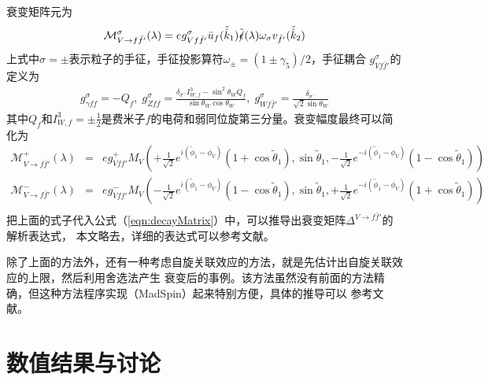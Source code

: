 衰变矩阵元为
\begin{eqnarray}
\mathcal{M}^{\sigma}_{V\to f\bar f'}(\lambda) = eg^{\sigma}_{Vf\bar f'} \bar{u}_f(\tilde{\hat k}_1)
\tilde{\slashed{\epsilon}}(\lambda) \omega_{\sigma}v_{\bar f'}(\tilde{\hat k}_2)
\label{eqn:decayMatrix}
\end{eqnarray}
上式中$\sigma = \pm$表示粒子的手征，手征投影算符$\omega_{\pm} = (1\pm\gamma_5)/2$，手征耦合
$g^{\sigma}_{Vf\bar f'}$的定义为
\begin{eqnarray}
g^{\sigma}_{\gamma ff} = -Q_f, \; g^{\sigma}_{Zff} = \frac{\delta_{\sigma^-}I^3_{W,f}-\sin^2\theta_W Q_f}
{\sin\theta_W\cos\theta_W}, \; g^{\sigma}_{Wf\bar f'} = \frac{\delta_{\sigma^-}}{\sqrt{2}\sin\theta_W}
\end{eqnarray}
其中$Q_f$和$I^3_{W,f} = \pm \frac{1}{2}$是费米子$f$的电荷和弱同位旋第三分量。衰变幅度最终可以简化为
\begin{eqnarray}
\mathcal{M}^+_{V\to f\bar f'}(\lambda) &=& eg^+_{Vff'}M_V\left(+\frac{1}{\sqrt 2}e^{i(\tilde{\phi}_1-
\phi_V)}(1+\cos\tilde{\theta}_1),\sin\tilde{\theta}_1, -\frac{1}{\sqrt 2}e^{-i(\tilde{\phi}_1 - \phi_V)}
(1-\cos\tilde{\theta}_1) \right) \nonumber \\
\mathcal{M}^-_{V\to f\bar f'}(\lambda) &=& eg^-_{Vff'}M_V\left(-\frac{1}{\sqrt 2}e^{i(\tilde{\phi}_1-
\phi_V)}(1-\cos\tilde{\theta}_1),\sin\tilde{\theta}_1, +\frac{1}{\sqrt 2}e^{-i(\tilde{\phi}_1 - \phi_V)}
(1+\cos\tilde{\theta}_1) \right) \nonumber \\
\end{eqnarray}
把上面的式子代入公式（\ref{eqn:decayMatrix}）中，可以推导出衰变矩阵$\Delta^{V\to f\bar f'}$的解析表达式，
本文略去，详细的表达式可以参考文献\cite{Ditt:pp2WWjet}。

除了上面的方法外，还有一种考虑自旋关联效应的方法，就是先估计出自旋关联效应的上限，然后利用舍选法产生
衰变后的事例。该方法虽然没有前面的方法精确，但这种方法程序实现（MadSpin）起来特别方便，具体的推导可以
参考文献\cite{madspin:theory,madspin:program}。

\section{数值结果与讨论}
